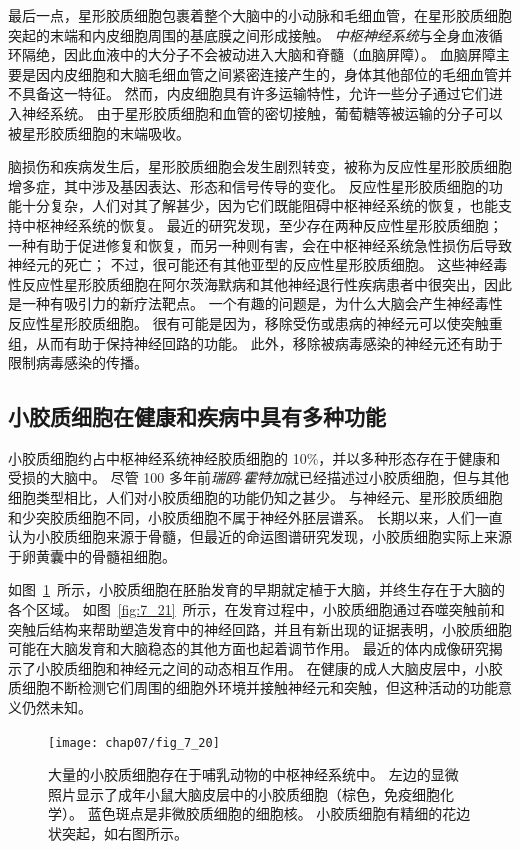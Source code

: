 最后一点，星形胶质细胞包裹着整个大脑中的小动脉和毛细血管，在星形胶质细胞突起的末端和内皮细胞周围的基底膜之间形成接触。
\textit{中枢神经系统}与全身血液循环隔绝，因此血液中的大分子不会被动进入大脑和脊髓（血脑屏障）。
血脑屏障主要是因内皮细胞和大脑毛细血管之间紧密连接产生的，身体其他部位的毛细血管并不具备这一特征。
然而，内皮细胞具有许多运输特性，允许一些分子通过它们进入神经系统。
由于星形胶质细胞和血管的密切接触，葡萄糖等被运输的分子可以被星形胶质细胞的末端吸收。


脑损伤和疾病发生后，星形胶质细胞会发生剧烈转变，被称为反应性星形胶质细胞增多症，其中涉及基因表达、形态和信号传导的变化。
反应性星形胶质细胞的功能十分复杂，人们对其了解甚少，因为它们既能阻碍中枢神经系统的恢复，也能支持中枢神经系统的恢复。
最近的研究发现，至少存在两种反应性星形胶质细胞；
一种有助于促进修复和恢复，而另一种则有害，会在中枢神经系统急性损伤后导致神经元的死亡；
不过，很可能还有其他亚型的反应性星形胶质细胞。
这些神经毒性反应性星形胶质细胞在阿尔茨海默病和其他神经退行性疾病患者中很突出，因此是一种有吸引力的新疗法靶点。
一个有趣的问题是，为什么大脑会产生神经毒性反应性星形胶质细胞。
很有可能是因为，移除受伤或患病的神经元可以使突触重组，从而有助于保持神经回路的功能。
此外，移除被病毒感染的神经元还有助于限制病毒感染的传播。


\subsection{小胶质细胞在健康和疾病中具有多种功能}

小胶质细胞约占中枢神经系统神经胶质细胞的 10\%，并以多种形态存在于健康和受损的大脑中。
尽管 100 多年前\textit{瑞鸥$\cdot$霍特加}就已经描述过小胶质细胞，但与其他细胞类型相比，人们对小胶质细胞的功能仍知之甚少。
与神经元、星形胶质细胞和少突胶质细胞不同，小胶质细胞不属于神经外胚层谱系。
长期以来，人们一直认为小胶质细胞来源于骨髓，但最近的命运图谱研究发现，小胶质细胞实际上来源于卵黄囊中的骨髓祖细胞。


如图~\ref{fig:7_20}~所示，小胶质细胞在胚胎发育的早期就定植于大脑，并终生存在于大脑的各个区域。
如图~\ref{fig:7_21}~所示，在发育过程中，小胶质细胞通过吞噬突触前和突触后结构来帮助塑造发育中的神经回路，并且有新出现的证据表明，小胶质细胞可能在大脑发育和大脑稳态的其他方面也起着调节作用。
最近的体内成像研究揭示了小胶质细胞和神经元之间的动态相互作用。
在健康的成人大脑皮层中，小胶质细胞不断检测它们周围的细胞外环境并接触神经元和突触，但这种活动的功能意义仍然未知。


\begin{figure}[htbp]
	\centering
	\texttt{[image: chap07/fig\_7\_20]}
	\caption{大量的小胶质细胞存在于哺乳动物的中枢神经系统中。
		左边的显微照片显示了成年小鼠大脑皮层中的小胶质细胞（棕色，免疫细胞化学）。
		蓝色斑点是非微胶质细胞的细胞核。
		小胶质细胞有精细的花边状突起，如右图所示。}
	\label{fig:7_20}
\end{figure}


